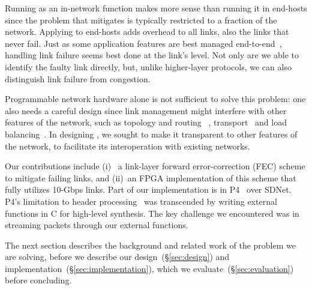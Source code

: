Running \OurSys as an in-network function makes more sense than
running it in end-hosts since the problem that \OurSys mitigates is
typically restricted to a fraction of the network.  Applying \OurSys to
end-hosts adds overhead to all links, also the links that never fail.
Just as some application features are
best managed end-to-end~\cite{Saltzer84end-to-endarguments}, handling
link failure seems best done at the link's level. Not only are we able to
identify the faulty link directly, but, unlike higher-layer protocols,
we can also distinguish link failure from congestion.

Programmable network hardware alone is not sufficient to solve this problem: one
also needs a careful design since link management might interfere with
other features of the network, such as topology and routing~
\cite{Greenberg:2011:VSF:1897852.1897877,
NiranjanMysore:2009:PSF:1594977.1592575,
Agarwal:2014:SMS:2620728.2620758},
transport~\cite{Raiciu:2011:IDP:2043164.2018467,Alizadeh:2010:DCT:1851275.1851192}
and load balancing~\cite{Alizadeh:2014:CDC:2740070.2626316}.
In designing \OurSys, we sought to make it transparent to other
features of the network, to facilitate its interoperation with
existing networks.

Our contributions include (i)~
a link-layer forward error-correction (FEC) scheme to mitigate failing
links, and (ii)~an FPGA implementation of this scheme that fully utilizes 10-Gbps
links. Part of our implementation is in
P4~\cite{Bosshart:2014:PPP:2656877.2656890} over SDNet.
P4's limitation to header processing~\cite{Dang:2017:WPL:3050220.3050231}
was transcended by writing external functions in C for high-level synthesis.
The key challenge we encountered was in streaming packets through our
external functions.%

The next section describes the background and related work of the problem we
are solving, before we describe our design~(\S\ref{sec:design}) and
implementation~(\S\ref{sec:implementation}), which we
evaluate~(\S\ref{sec:evaluation}) before concluding.

